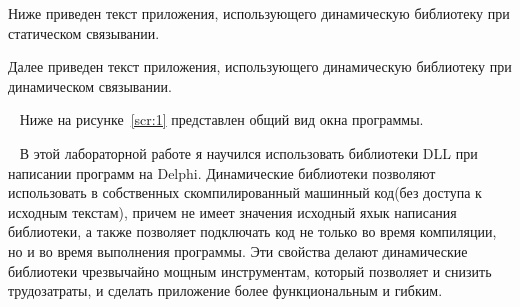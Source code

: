 Ниже приведен текст приложения, использующего динамическую библиотеку при статическом связывании.

Далее приведен текст приложения, использующего динамическую библиотеку при динамическом связывании.

\clearpage

\ 
Ниже на рисунке~\ref{scr:1} представлен общий вид окна программы.
\suppressfloats[t]
{}

\ 
В этой лабораторной работе я научился использовать библиотеки DLL при написании программ на Delphi. Динамические библиотеки позволяют использовать в собственных скомпилированный машинный код(без доступа к исходным текстам), причем не имеет значения исходный яхык написания библиотеки, а также позволяет подключать код не только во время компиляции, но и во время выполнения программы. Эти свойства делают динамические библиотеки чрезвычайно мощным инструментам, который позволяет и снизить трудозатраты, и сделать приложение более функциональным и гибким.

